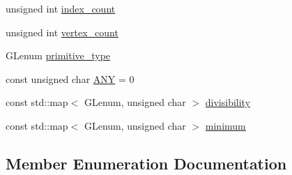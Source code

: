 \begin{DoxyCompactItemize}
\item 
unsigned int \hyperlink{class_graphics_1_1_vertex_data_ad998da458e1adca27ad17487e9ae38c6}{index\+\_\+count}
\item 
unsigned int \hyperlink{class_graphics_1_1_vertex_data_a82d5178d37db91235313309418f1ed8e}{vertex\+\_\+count}
\item 
G\+Lenum \hyperlink{class_graphics_1_1_vertex_data_a3940832a3699c42ea2d9f4e0943653aa}{primitive\+\_\+type}
\item 
const unsigned char \hyperlink{class_graphics_1_1_vertex_data_a0fc546e15f8fc02868e94246b93dd1b5}{A\+N\+Y} = 0
\item 
const std\+::map$<$ G\+Lenum, unsigned char $>$ \hyperlink{class_graphics_1_1_vertex_data_a4a88da3318b4c8deff9fa6168e75dd0a}{divisibility}
\item 
const std\+::map$<$ G\+Lenum, unsigned char $>$ \hyperlink{class_graphics_1_1_vertex_data_a65a814100217b32cc5a1f7a9bbd7f13c}{minimum}
\end{DoxyCompactItemize}


\subsection{Member Enumeration Documentation}
\hypertarget{class_graphics_1_1_vertex_data_a50e88236939dc2a3ec4df7aeb728620e}{}
